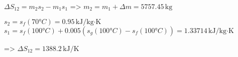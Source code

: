 \( \Delta S_{12} = m_{2} s_{2} - m_{1} s_{1} \)  
=> \( m_{2} = m_{1} + \Delta m = 5757.45 \, \text{kg} \)  

\( s_{2} = s_{f}(70°C) = 0.95 \, \text{kJ/kg·K} \)  
\( s_{1} = s_{f}(100°C) + 0.005 (s_{g}(100°C) - s_{f}(100°C)) = 1.33714 \, \text{kJ/kg·K} \)  

=> \( \Delta S_{12} = 1388.2 \, \text{kJ/K} \)